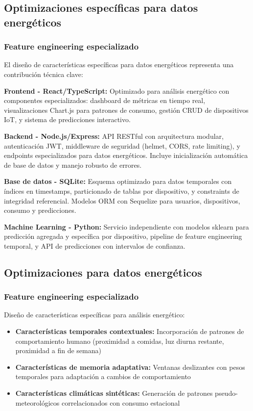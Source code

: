 \subsection{Optimizaciones específicas para datos energéticos}

\subsubsection{Feature engineering especializado}

El diseño de características específicas para datos energéticos representa una contribución técnica clave:

\textbf{Frontend - React/TypeScript:}
Optimizado para análisis energético con componentes especializados: dashboard de métricas en tiempo real, visualizaciones Chart.js para patrones de consumo, gestión CRUD de dispositivos IoT, y sistema de predicciones interactivo.

\textbf{Backend - Node.js/Express:}
API RESTful con arquitectura modular, autenticación JWT, middleware de seguridad (helmet, CORS, rate limiting), y endpoints especializados para datos energéticos. Incluye inicialización automática de base de datos y manejo robusto de errores.

\textbf{Base de datos - SQLite:}
Esquema optimizado para datos temporales con índices en timestamps, particionado de tablas por dispositivo, y constraints de integridad referencial. Modelos ORM con Sequelize para usuarios, dispositivos, consumo y predicciones.

\textbf{Machine Learning - Python:}
Servicio independiente con modelos sklearn para predicción agregada y específica por dispositivo, pipeline de feature engineering temporal, y API de predicciones con intervalos de confianza.

\subsection{Optimizaciones para datos energéticos}

\subsubsection{Feature engineering especializado}

Diseño de características específicas para análisis energético:

\begin{itemize}
    \item \textbf{Características temporales contextuales:} Incorporación de patrones de comportamiento humano (proximidad a comidas, luz diurna restante, proximidad a fin de semana)
    \item \textbf{Características de memoria adaptativa:} Ventanas deslizantes con pesos temporales para adaptación a cambios de comportamiento
    \item \textbf{Características climáticas sintéticas:} Generación de patrones pseudo-meteorológicos correlacionados con consumo estacional
\end{itemize}

